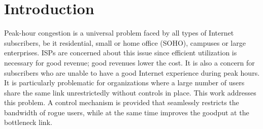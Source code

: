 \documentclass[conference]{../../IEEEtran}
\begin{document}
\begin{abstract}
\end{abstract}





%
\IEEEpeerreviewmaketitle



\section{Introduction}
Peak-hour congestion is a universal problem faced by all types of Internet subscribers, be it residential, small or home office (SOHO), campuses or large enterprises. ISPs are concerned about this issue since efficient utilization is necessary for good revenue; good revenues lower the cost.  It is also a concern for subscribers who are unable to have a good Internet experience during peak hours. It is particularly problematic for organizations where a large number of users share the same link unrestrictedly without controls in place. This work addresses this problem. A control mechanism is provided that seamlessly restricts the bandwidth of rogue users, while at the same time improves the goodput at the bottleneck link.
\end{document}
